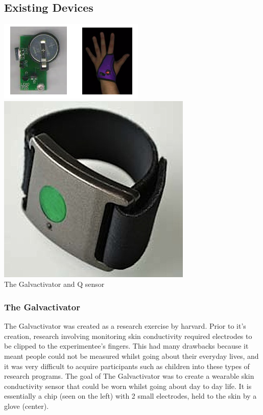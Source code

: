 \documentclass{scrartcl}
\begin{document}
\subsection{Existing Devices}
\begin{center}
    \includegraphics[scale=0.8]{img/existingdevices.png} \hspace{10mm} 
    \includegraphics[scale=0.3]{img/q-sensor.jpg}\\
    The Galvactivator and Q sensor
\end{center}
\subsubsection{The Galvactivator}
The Galvactivator was created as a research exercise by harvard. Prior to it's creation,
research involving monitoring skin conductivity required electrodes to be clipped to the
experimentee's fingers. This had many drawbacks because it meant people could not be measured
whilst going about their everyday lives, and it was very difficult to acquire participants
such as children into these types of research programs. The goal of The Galvactivator was to
create a wearable skin conductivity sensor that could be worn whilst going about day to day
life. It is essentially a chip (seen on the left) with 2 small electrodes, held to the skin
by a glove (center). 
\end{document}
